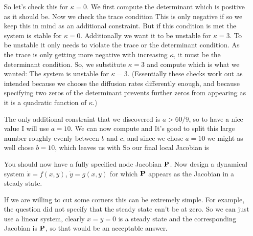 So let's check this for $\kappa=0$.  We first compute the 
determinant 
which is positive as it should be. Now we check the trace condition
This is only negative if 
so we keep this in mind as an additional constraint. But if this condition is met the system is stable for $\kappa=0$. Additionally we want it to be unstable for $\kappa=3$. To be unstable it only needs to violate the trace or the determinant condition. As the trace is only getting more negative with increasing $\kappa$, it must be the determinant condition. So, we substitute $\kappa =3 $ and compute 
which is what we wanted: The system is unstable for $\kappa=3$. (Essentially these checks work out as intended because we choose the diffusion rates differently enough, and because specifying two zeros of the determinant prevents further zeros from appearing as it is a quadratic function of $\kappa$.)

The only additional constraint that we discovered is $a>60/9$, so to have a nice value I will use $a=10$. We can now compute 
and 
It's good to split this large number roughly evenly between $b$ and $c$, and since we chose $a=10$ we might as well chose $b=10$, which leaves us with
So our final local Jacobian is 

\subquestion 
You should now have a fully specified node Jacobian $\bf P$. Now design a dynamical system $\dot{x}=f(x,y)$, $\dot{y}=g(x,y)$ for which $\bf P$ appears as the Jacobian in a steady state. 

\solution 
If we are willing to cut some corners this can be extremely simple. For example, the question did not specify that the steady state can't be at zero. So we can just use a linear system,
clearly $x=y=0$ is a steady state and the corresponding Jacobian is $\bf P$, so that would be an acceptable answer. 

